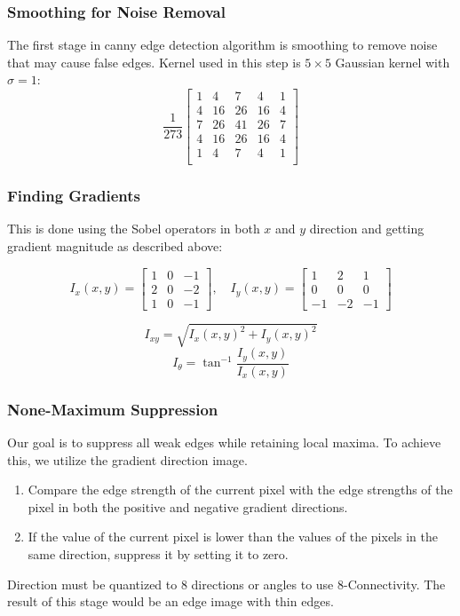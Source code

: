 \documentclass{article}
\begin{document}
	\subsubsection{Smoothing for Noise Removal}
	\label{subsubsec:1.3.1}
	
	The first stage in canny edge detection algorithm is smoothing to remove noise that may cause false edges. Kernel used in this step is $5 \times 5$ Gaussian kernel with $\sigma = 1$:
	$$\frac{1}{273} \begin{bmatrix}
		1 & 4 & 7 & 4 & 1 \\
		4 & 16 & 26 & 16 & 4 \\
		7 & 26 & 41 & 26 & 7 \\
		4 & 16 & 26 & 16 & 4 \\
		1 & 4 & 7 & 4 & 1 \\
	\end{bmatrix}$$
		
	\subsubsection{Finding Gradients}
	This is done using the Sobel operators in both $x$ and $y$ direction and getting gradient magnitude as described above:
	
	$$I_x(x,y) = \begin{bmatrix} 1 & 0 & -1 \\ 2 & 0 & -2 \\ 1 & 0 & -1 \end{bmatrix}, \quad I_y(x,y) = \begin{bmatrix} 1 & 2 & 1 \\ 0 & 0 & 0 \\ -1 & -2 & -1 \end{bmatrix}$$
	
	$$I_{xy} = \sqrt{I_x(x,y)^2 + I_y(x,y)^2}$$
	$$I_\theta = \tan^{-1} \frac{I_y(x,y)}{I_x(x,y)}$$
	
	\subsubsection{None-Maximum Suppression}
	
	Our goal is to suppress all weak edges while retaining local maxima. To achieve this, we utilize the gradient direction image.
	
	\begin{enumerate}
		\item Compare the edge strength of the current pixel with the edge strengths of the pixel in both the positive and negative gradient directions.
		\item If the value of the current pixel is lower than the values of the pixels in the same direction, suppress it by setting it to zero.
	\end{enumerate}
	Direction must be quantized to 8 directions or angles to use 8-Connectivity. The result of this stage would be an edge image with thin edges. 
	
\end{document}
